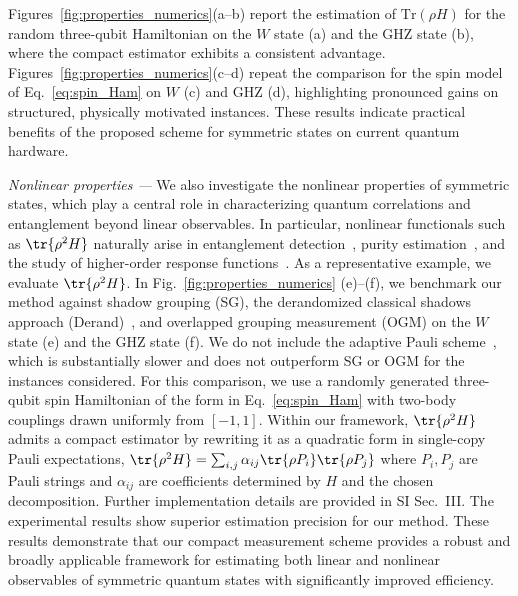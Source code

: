 \documentclass[prl,aps,twocolumn,notitlepage,superscriptaddress,showpacs,nofootinbib]{revtex4-2}
\begin{document}
Figures~\ref{fig:properties_numerics}(a–b) report the estimation of $\mathrm{Tr}(\rho H)$ for the random three-qubit Hamiltonian on the $W$ state (a) and the GHZ state (b), where the compact estimator exhibits a consistent advantage. Figures~\ref{fig:properties_numerics}(c–d) repeat the comparison for the spin model of Eq.~\eqref{eq:spin_Ham} on $W$ (c) and GHZ (d), highlighting pronounced gains on structured, physically motivated instances. These results indicate practical benefits of the proposed scheme for symmetric states on current quantum hardware.


\textit{Nonlinear properties --- }
We also investigate the nonlinear properties of symmetric states, which play a central role in characterizing quantum correlations and entanglement beyond linear observables. In particular, nonlinear functionals such as $\tr{\rho^2 H}$ naturally arise in entanglement detection~\cite{guhne2009entanglement,cao2023generation}, purity estimation~\cite{ekert2002direct,brydges2019probing,wu2025state}, and the study of higher-order response functions~\cite{hamm2005principles}. As a representative example, we evaluate $\tr{\rho^2 H}$. In Fig.~\ref{fig:properties_numerics} (e)--(f), we benchmark our method against shadow grouping (SG), the derandomized classical shadows approach (Derand)~\cite{Huang2021Efficient}, and overlapped grouping measurement (OGM) on the $W$ state (e) and the GHZ state (f). We do not include the adaptive Pauli scheme~\cite{Shlosberg2023Adaptive}, which is substantially slower and does not outperform SG or OGM for the instances considered. For this comparison, we use a randomly generated three-qubit spin Hamiltonian of the form in Eq.~\eqref{eq:spin_Ham} with two-body couplings drawn uniformly from $[-1,1]$. Within our framework, $\tr{\rho^{2}H}$ admits a compact estimator by rewriting it as a quadratic form in single-copy Pauli expectations,
 $\tr{\rho^{2}H} = \sum_{i,j}\alpha_{ij}\tr{\rho P_i}\tr{\rho P_j}$ where $P_i,P_j$ are Pauli strings and $\alpha_{ij}$ are coefficients determined by $H$ and the chosen decomposition. Further implementation details are provided in SI Sec.~III. The experimental results show superior estimation precision for our method. These results demonstrate that our compact measurement scheme provides a robust and broadly applicable framework for estimating both linear and nonlinear observables of symmetric quantum states with significantly improved efficiency.
\end{document}
